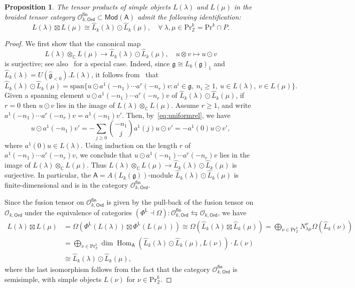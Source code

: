 \documentclass[12pt,a4paper,reqno]{amsart}
\numberwithin{equation}{section}
\newtheorem{proposition}[theorem]{Proposition}
\theoremstyle{definition}
\newcommand{\g}{\mathfrak{g}}
\newcommand{\Hom}{\operatorname{Hom}}
\newcommand{\C}{\mathbb{C}}
\newcommand{\Z}{\mathbb{Z}}
\def\O{\mathcal{O}}
\def\Ord{\mathsf{Ord}}
\def\Mod{\mathsf{Mod}}
\def\fin{\mathsf{fin}}
\def\L{\mathsf{L}}
\def\Om{\Omega}
\def\Pr{\mathrm{Pr}}
\def\la{\lambda}
\def\spn{\mathrm{span}}
\def\o{\otimes}
\def\ra{\rightarrow}
\def\A{\mathsf{A}}
\begin{document}
\begin{proposition}\label{prop:6.2}
    The tensor products of simple objects $L(\la)$ and $L(\mu)$ in the braided tensor category $\O^\fin_{k,\Ord}\subset \Mod(\A)$ admit the following identification:
\begin{equation}\label{eq:affinefinitefusion}
L(\la)\boxtimes L(\mu)\cong \hat{L}_k(\la)\odot \hat{L}_k(\mu),\quad \forall\  \la,\mu\in \Pr^k_\Z=\Pr^k\cap P.
\end{equation}
\end{proposition}
\begin{proof}
We first show
that the canonical map
\[
L(\la)\o_\C L(\mu)\ra \hat{L}_k(\la)\odot \hat{L}_k(\mu),\quad u\o v\mapsto u\odot v
\]
is surjective; see also~\cite[Lemma 7.5]{L26} for a special case.
Indeed, since $\g\cong L_k(\g)_1$ and $\hat{L}_k(\la)=U(\hat{\g}_{<0}).L(\la)$, it follows from~\cite[Lemma 4.5]{L26} that
\[
\hat{L}_k(\la)\odot \hat{L}_k(\mu)=\spn\{u\odot a^1(-n_1)\cdots a^r(-n_r)v: a^i\in\g,\ n_i\geq 1,\ u\in L(\la),\ v\in L(\mu)\}.
\]
Given a spanning element $u\odot a^1(-n_1)\cdots a^r(-n_r)v$ of $\hat{L}_k(\la)\odot \hat{L}_k(\mu)$, if $r=0$ then $u\odot v$ lies in the image of $L(\la)\o_\C L(\mu)$. Assume $r\geq 1$, and write $a^1(-n_1)\cdots a^r(-n_r)v=a^1(-n_1)v'$.
Then, by~\eqref{eq:uniformrel}, we have
\[
u\odot a^1(-n_1)v'=-\sum_{j\geq 0}\binom{-n_1}{j} a^1(j)u\odot v'=-a^1(0)u\odot v',
\]
where $a^1(0)u\in L(\la)$. Using induction on the length $r$ of $a^1(-n_1)\cdots a^r(-n_r)v$, we conclude that $u\odot a^1(-n_1)\cdots a^r(-n_r)v$ lies in the image of $L(\la)\o_\C L(\mu)$. Thus $L(\la)\o_\C L(\mu)\ra \hat{L}_k(\la)\odot \hat{L}_k(\mu)$ is surjective.
In particular, the $\A=A(L_k(\g))$-module $\hat{L}_k(\la)\odot \hat{L}_k(\mu)$ is finite-dimensional and is in the category $\O^\fin_{k,\Ord}$.

Since the fusion tensor on $\O^\fin_{k,\Ord}$ is given by the pull-back of the fusion tensor on $\O_{k,\Ord}$ under the equivalence of categories  $(\Phi^\L\dashv \Om):\O_{k,\Ord}^\fin\leftrightarrows \O_{k,\Ord}$, we have
\begin{align*}
L(\la)\boxtimes L(\mu)&=\Om(\Phi^\L(L(\la))\boxtimes \Phi^\L(L(\mu)))\cong\Om(\hat{L}_k(\la)\boxtimes \hat{L}_k(\mu))=\bigoplus_{\nu\in \Pr^k_\Z}N_{\la\mu}^\nu\Om(\hat{L}_k(\nu))\\
&=\bigoplus_{\nu\in \Pr^k_\Z}\dim \Hom_\A\left(\hat{L}_k(\la)\odot \hat{L}_k(\mu), L(\nu) \right) \cdot L(\nu)\\
&\cong \hat{L}_k(\la)\odot \hat{L}_k(\mu),
\end{align*}
where the last isomorphism follows from the fact that the category $\O^\fin_{k,\Ord} $ is semisimple, with simple objects $L(\nu)$ for $\nu\in \Pr^k_\Z$.
\end{proof}
\end{document}
